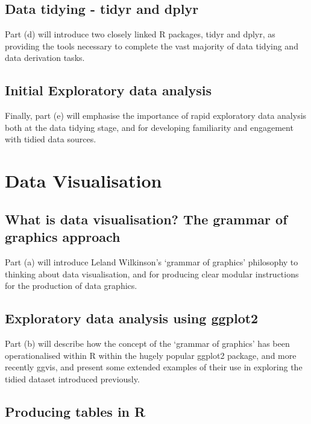 \documentclass[]{book}
\theoremstyle{definition}
\theoremstyle{definition}
\theoremstyle{definition}
\theoremstyle{remark}
\begin{document}
\section{Data tidying - tidyr and
dplyr}\label{data-tidying---tidyr-and-dplyr}

Part (d) will introduce two closely linked R packages, tidyr and dplyr,
as providing the tools necessary to complete the vast majority of data
tidying and data derivation tasks.

\section{Initial Exploratory data
analysis}\label{initial-exploratory-data-analysis}

Finally, part (e) will emphasise the importance of rapid exploratory
data analysis both at the data tidying stage, and for developing
familiarity and engagement with tidied data sources.

\chapter{Data Visualisation}\label{data_vis}

\section{What is data visualisation? The grammar of graphics
approach}\label{what-is-data-visualisation-the-grammar-of-graphics-approach}

Part (a) will introduce Leland Wilkinson's `grammar of graphics'
philosophy to thinking about data visualisation, and for producing clear
modular instructions for the production of data graphics.

\section{Exploratory data analysis using
ggplot2}\label{exploratory-data-analysis-using-ggplot2}

Part (b) will describe how the concept of the `grammar of graphics' has
been operationalised within R within the hugely popular ggplot2 package,
and more recently ggvis, and present some extended examples of their use
in exploring the tidied dataset introduced previously.

\section{Producing tables in R}\label{producing-tables-in-r}
\end{document}
